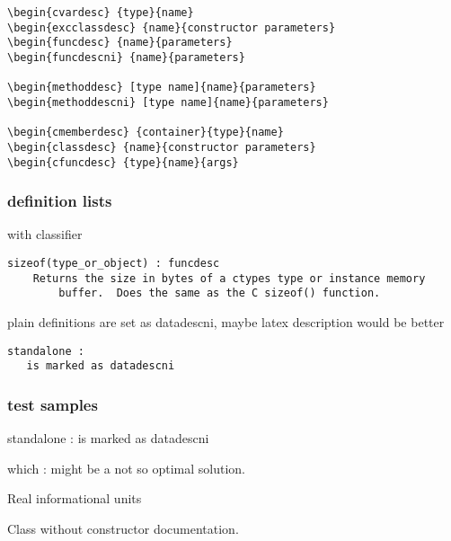 \begin{verbatim}
\begin{cvardesc} {type}{name}
\begin{excclassdesc} {name}{constructor parameters}
\begin{funcdesc} {name}{parameters}
\begin{funcdescni} {name}{parameters}

\begin{methoddesc} [type name]{name}{parameters}
\begin{methoddescni} [type name]{name}{parameters}

\begin{cmemberdesc} {container}{type}{name}
\begin{classdesc} {name}{constructor parameters}
\begin{cfuncdesc} {type}{name}{args}
\end{verbatim}


\subsubsection{definition lists\label{-definition-lists}}

with classifier
\begin{verbatim}
sizeof(type_or_object) : funcdesc
    Returns the size in bytes of a ctypes type or instance memory
        buffer.  Does the same as the C sizeof() function.
\end{verbatim}

plain definitions are set as datadescni, maybe latex description would
be better
\begin{verbatim}
standalone :
   is marked as datadescni
\end{verbatim}


\subsubsection{test samples\label{-test-samples}}

\begin{datadescni}{standalone :}
is marked as datadescni
\end{datadescni}

\begin{datadescni}{which :}
might be a not so optimal solution.
\end{datadescni}

Real informational units

\begin{classdesc*}{Class}
without constructor documentation.
\end{classdesc*}

